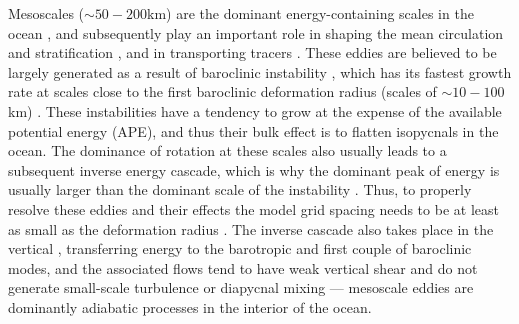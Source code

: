 \documentclass[draft]{agujournal2019}
\begin{document}
Mesoscales ($\sim50-200$km) are the dominant energy-containing scales in the ocean \cite{ferrari2009ocean}, and subsequently play an important role in shaping the mean circulation and stratification \cite{gent2011gent}, and in transporting tracers \cite{abernathey2015phase}. These eddies are believed to be largely generated as a result of baroclinic instability \cite{gill1974energy, smith2007geography}, which has its fastest growth rate at scales close to the first baroclinic deformation radius (scales of $\sim10-100$km) \cite{chelton1998geographical, tulloch2011scales}. These instabilities have a tendency to grow at the expense of the available potential energy (APE), and thus their bulk effect is to flatten isopycnals in the ocean. The dominance of rotation at these scales also usually leads to a subsequent inverse energy cascade, which is why the dominant peak of energy is usually larger than the dominant scale of the instability \cite{tulloch2011scales}. 
Thus, to properly resolve these eddies and their effects the model grid spacing needs to be at least as small as the deformation radius \cite{hallberg2013using}. The inverse cascade also takes place in the vertical \cite{smith2002scales}, transferring energy to the barotropic and first couple of baroclinic modes, and the associated flows tend to have weak vertical shear and do not generate small-scale turbulence or diapycnal mixing --- mesoscale eddies are dominantly adiabatic processes in the interior of the ocean. 
\end{document}
